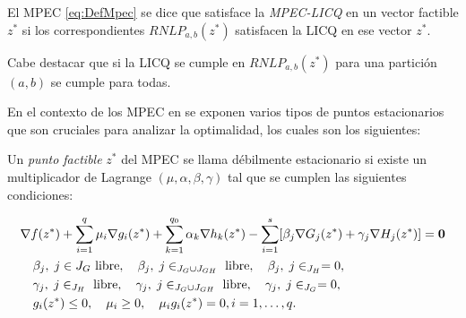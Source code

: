 \begin{definition}
El MPEC \eqref{eq:DefMpec} se dice que satisface la \textit{MPEC-LICQ}  en un vector factible $z^*$ si los correspondientes $RNLP_{a,b}(z^*)$ satisfacen la LICQ  en ese vector $z^*$.
\end{definition}
    Cabe destacar que si la LICQ se cumple en  $RNLP_{a,b}(z^*)$ para una partición $(a,b)$ se cumple para todas. 

En el contexto de los MPEC en \cite{Flegel2003AFJ} se exponen varios tipos de puntos estacionarios que son cruciales para analizar la optimalidad, los cuales son los siguientes:
\begin{definition}
    Un \textit{punto factible} $z^*$ del MPEC se llama débilmente estacionario si existe un multiplicador de Lagrange $ (\mu, \alpha, \beta, \gamma)$ tal que se cumplen las siguientes condiciones:
    
\begin{align}
& \nabla f(z^*) + \sum_{i=1}^q \mu_i\nabla g_i(z^*) + \sum_{k=1}^{q_0} \alpha_k\nabla h_k(z^*) - \sum_{i=1}^{s} [\beta_j\nabla G_j(z^*) + \gamma_j\nabla H_j(z^*)] = \vec{0} \notag\\
    & \quad \begin{aligned}
        & \beta_j,\; j\in {J_G} \text{ libre}, \quad  \beta_j,\; j\in _{J_G\cup J_{GH}} \text{ libre}, \quad \beta_j,\; j\in _{J_H}= 0, \\
        &  \gamma_j,\; j\in _{J_H} \text{ libre}, \quad  \gamma_j,\; j\in _{J_G\cup J_{GH}} \text{ libre}, \quad \gamma_j,\; j\in _{J_G}= 0,  \\
        & g_i(z^*) \leq 0, \quad \mu_i \geq 0, \quad \mu_i g_i(z^*) = 0, i=1,\ldots, q.
    \end{aligned} \\
& \label{eq:Definici\'on_punto_debilemente_estacionario} \notag
\end{align}
\end{definition}


